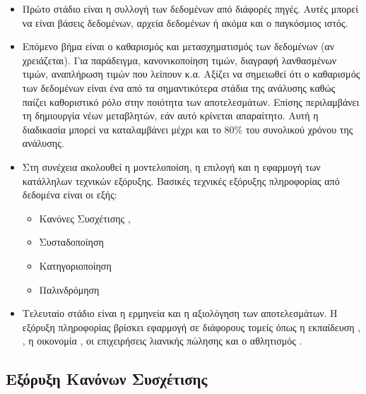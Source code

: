 \documentclass[12pt,a4paper,final]{article}
\begin{document}
\begin{itemize}
	\item Πρώτο στάδιο είναι η συλλογή των δεδομένων από διάφορές πηγές. Αυτές μπορεί να είναι βάσεις δεδομένων, αρχεία δεδομένων ή  ακόμα και ο παγκόσμιος ιστός.
	\item Επόμενο βήμα είναι ο καθαρισμός και μετασχηματισμός των δεδομένων (αν χρειάζεται). Για παράδειγμα, κανονικοποίηση τιμών, διαγραφή λανθασμένων τιμών, αναπλήρωση τιμών που λείπουν κ.α. Αξίζει να σημειωθεί ότι ο καθαρισμός των δεδομένων είναι ένα από τα σημαντικότερα στάδια της ανάλυσης  καθώς παίζει καθοριστικό ρόλο στην ποιότητα των αποτελεσμάτων. Επίσης περιλαμβάνει τη δημιουργία νέων μεταβλητών, εάν αυτό κρίνεται απαραίτητο. Αυτή η διαδικασία μπορεί να καταλαμβάνει μέχρι και το 80\% του συνολικού χρόνου της ανάλυσης. 
	\item Στη συνέχεια ακολουθεί η μοντελοποίση, η επιλογή και η εφαρμογή των κατάλληλων τεχνικών εξόρυξης. Βασικές τεχνικές εξόρυξης πληροφορίας από δεδομένα είναι οι εξής:
	\begin{itemize}
		\item Κανόνες Συσχέτισης \foreignlanguage{english}{\cite{associationRules_apriori4},\cite{associatio_rules7}}
		\item Συσταδοποίηση \foreignlanguage{english}{\cite{clustering}}
		\item Κατηγοριοποίηση \foreignlanguage{english}{\cite{classification}}
		\item Παλινδρόμηση \foreignlanguage{english}{\cite{regressionModel}}
	\end{itemize}	
	\item Τελευταίο στάδιο είναι  η ερμηνεία και η αξιολόγηση των αποτελεσμάτων. Η εξόρυξη πληροφορίας βρίσκει εφαρμογή  σε  διάφορους τομείς όπως η εκπαίδευση \foreignlanguage{english}{\cite{educational_mining5}, \cite{miningEducation1}, \cite{OugKDD8}} η οικονομία \foreignlanguage{english}{\cite{economy}}, οι επιχειρήσεις λιανικής πώλησης \foreignlanguage{english}{\cite{retail}} και ο αθλητισμός \foreignlanguage{english}{\cite{sports}}.
	
\end{itemize}

\subsection{Εξόρυξη Κανόνων Συσχέτισης}
\end{document}
